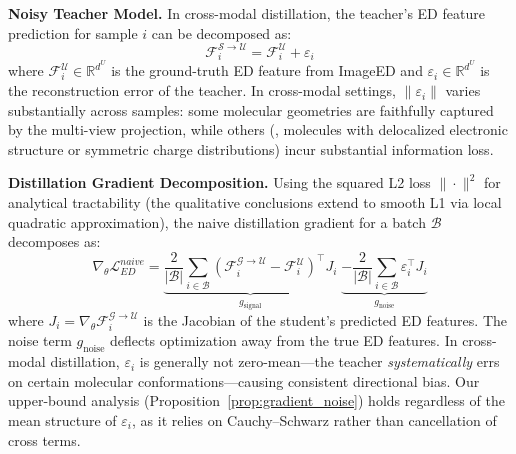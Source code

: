 \textbf{Noisy Teacher Model.} In cross-modal distillation, the teacher's ED feature prediction for sample $i$ can be decomposed as:
\begin{equation}
\label{eq:teacher_decomp}
    \mathcal{F}^{\mathcal{S}\rightarrow\mathcal{U}}_i = \mathcal{F}^{\mathcal{U}}_i + \varepsilon_i
\end{equation}
where $\mathcal{F}^{\mathcal{U}}_i \in \mathbb{R}^{d^U}$ is the ground-truth ED feature from ImageED and $\varepsilon_i \in \mathbb{R}^{d^U}$ is the reconstruction error of the teacher. In cross-modal settings, $\|\varepsilon_i\|$ varies substantially across samples: some molecular geometries are faithfully captured by the multi-view projection, while others (\eg, molecules with delocalized electronic structure or symmetric charge distributions) incur substantial information loss.

\textbf{Distillation Gradient Decomposition.} Using the squared L2 loss $\|\cdot\|^2$ for analytical tractability (the qualitative conclusions extend to smooth L1 via local quadratic approximation), the naive distillation gradient for a batch $\mathcal{B}$ decomposes as:
\begin{equation}
\label{eq:grad_decomp}
    \nabla_\theta \mathcal{L}^{naive}_{ED} = \underbrace{\frac{2}{|\mathcal{B}|} \!\sum_{i \in \mathcal{B}} \!\left(\mathcal{F}^{\mathcal{G}\!\rightarrow\!\mathcal{U}}_i - \mathcal{F}^{\mathcal{U}}_i\right)^{\!\top} \!\! J_i}_{\displaystyle g_{\text{signal}}} \; \underbrace{- \frac{2}{|\mathcal{B}|} \!\sum_{i \in \mathcal{B}} \varepsilon_i^\top J_i}_{\displaystyle g_{\text{noise}}}
\end{equation}
where $J_i = \nabla_\theta \mathcal{F}^{\mathcal{G}\rightarrow\mathcal{U}}_i$ is the Jacobian of the student's predicted ED features. The noise term $g_{\text{noise}}$ deflects optimization away from the true ED features. In cross-modal distillation, $\varepsilon_i$ is generally not zero-mean---the teacher \emph{systematically} errs on certain molecular conformations---causing consistent directional bias. Our upper-bound analysis (Proposition~\ref{prop:gradient_noise}) holds regardless of the mean structure of $\varepsilon_i$, as it relies on Cauchy--Schwarz rather than cancellation of cross terms.

